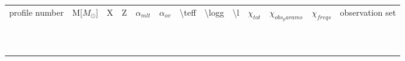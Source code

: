 \begin{table}[]
	\begin{tabular}{lllllllllllll}
		profile number & M{[}$M_\odot${]} & X & Z & $\alpha_{mlt}$ & $\alpha_{ov}$ & \textbackslash{}teff & \textbackslash{}logg & \textbackslash{}l & $\chi_{tot}$ & $\chi_{obs_params}$ & $\chi_{freqs}$ & observation set \\
		&                  &   &   &                &               &                      &                      &                   &              &                     &                &                 \\
		&                  &   &   &                &               &                      &                      &                   &              &                     &                &                 \\
		&                  &   &   &                &               &                      &                      &                   &              &                     &                &                 \\
		&                  &   &   &                &               &                      &                      &                   &              &                     &                &                 \\
		&                  &   &   &                &               &                      &                      &                   &              &                     &                &                 \\
		&                  &   &   &                &               &                      &                      &                   &              &                     &                &                 \\
		&                  &   &   &                &               &                      &                      &                   &              &                     &                &                 \\
		&                  &   &   &                &               &                      &                      &                   &              &                     &                &                 \\
		&                  &   &   &                &               &                      &                      &                   &              &                     &                &                 \\
		&                  &   &   &                &               &                      &                      &                   &              &                     &                &                 \\

\end{tabular}
\end{table}

